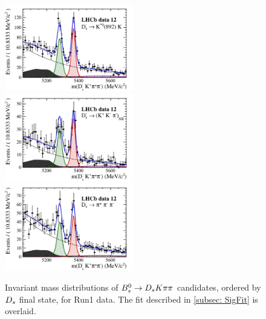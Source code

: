 \begin{figure}[h]
\includegraphics[height=!,width=0.5\textwidth]{figs/signal_y12_KsK.pdf}
\includegraphics[height=!,width=0.5\textwidth]{figs/signal_y12_KKpi_NR.pdf}
\includegraphics[height=!,width=0.5\textwidth]{figs/signal_y12_pipipi.pdf}
\caption{Invariant mass distributions of ${{B}^0_{s}}\rightarrow{\ensuremath{{D}_{s}}}{\ensuremath{K}}{\ensuremath{\pi}}{\ensuremath{\pi}}$ candidates, ordered by ${{D}_{s}}$ final state, for Run1 data.
The fit described in \ref{subsec: SigFit} is overlaid.}
\label{fig:massfits_signal_Run1}
\end{figure}

\clearpage

